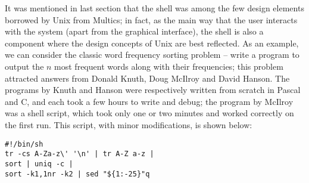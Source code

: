 It was mentioned in last section that the shell was among the few design
elements borrowed by Unix from Multics; in fact, as the main way that the user
interacts with the system (apart from the graphical
interface), the shell is also a component where the design concepts of Unix
are best reflected.  As an example, we can consider the classic word frequency
sorting problem -- write a program to output the $n$
most frequent words along with their frequencies; this problem attracted
answers from Donald Knuth, Doug McIlroy and David Hanson.  The programs by
Knuth and Hanson were respectively written from scratch in Pascal and C, and
each took a few hours to write and debug; the program by McIlroy was a shell
script, which took only one or two minutes and worked correctly on the
first run.  This script, with minor modifications, is shown below:
\begin{wquoting}
\begin{Verbatim}
#!/bin/sh
tr -cs A-Za-z\' '\n' | tr A-Z a-z |
sort | uniq -c |
sort -k1,1nr -k2 | sed "${1:-25}"q
\end{Verbatim}
\end{wquoting}

